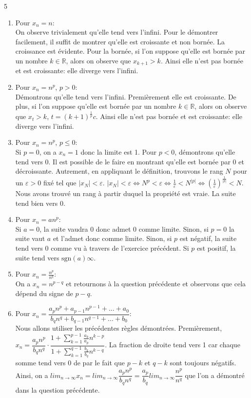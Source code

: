 5\documentclass[a4paper, 12pt, french, twoside]{article}
\newcommand{\Rr}{{\mathbb{R}}}
\begin{document}
\begin{enumerate}
    \item Pour $x_n=n$: \\
    On observe trivialement qu'elle tend vers l'infini. Pour le démontrer facilement, il suffit de montrer qu'elle est croissante et non bornée. La croissance est évidente. Pour la bornée, si l'on suppose qu'elle est bornée par un nombre $k\in \Rr$, alors on observe que $x_{k+1}>k$. Ainsi elle n'est pas bornée et est croissante: elle diverge vers l'infini.
    \item Pour $x_n=n^p$, $p>0$: \\
    Démontrons qu'elle tend vers l'infini. Premièrement elle est croissante. De plus, si l'on suppose qu'elle est bornée par un nombre $k\in \Rr$, alors on observe que $x_{t}>k$, $t=(k+1)^\tfrac{1}{p}c$. Ainsi elle n'est pas bornée et est croissante: elle diverge vers l'infini.
    \item Pour $x_n=n^p$, $p\leq0$: \\
    Si $p=0$, on a $x_n=1$ donc la limite est 1.
    Pour $p<0$, démontrons qu'elle tend vers 0. Il est possible de le faire en montrant qu'elle est bornée par 0 et décroissante. Autrement, en appliquant le définition, trouvons le rang $N$ pour un $\varepsilon>0$ fixé tel que $|x_N|<\varepsilon$.
    $|x_N|<\varepsilon \iff N^p<\varepsilon \iff \frac{1}{\varepsilon}<N^{|p|}\iff \left( \frac{1}{\varepsilon}\right)^{\tfrac{1}{|p|}} <N $. Nous avons trouvé un rang à partir duquel la propriété est vraie. La suite tend bien vers 0.
    \item Pour $x_n=a n^p$:\\
    Si $a=0$, la suite vaudra 0 donc admet 0 comme limite. Sinon, si $p=0$ la suite vaut $a$ et l'admet donc comme limite. Sinon, si $p$ est négatif, la suite tend vers 0 comme vu à travers de l'exercice précédent. Si $p$ est positif, la suite tend vers $\text{sgn}(a) \infty$.
    \item Pour $x_n=\frac{n^p}{n^q}$:\\
    On a $x_n=n^{p-q}$ et retournons à la question précédente et observons que cela dépend du signe de $p-q$.
    \item Pour $x_n=\dfrac{a_pn^p+a_{p-1}n^{p-1}+...+a_0}{b_qn^q+b_{q-1}n^{q-1}+...+b_0}$:\\
    Nous allons utiliser les précédentes règles démontrées. Premièrement, $x_n=\dfrac{a_pn^p}{b_qn^q}\cdot\dfrac{1+\sum_{k=1}^{p-1} \frac{a_k}{a_p}n^{k-p}}{1+\sum_{k=1}^{q-1} \frac{b_k}{b_q}n^{k-q}}$. La fraction de droite tend vers 1 car chaque somme tend vers 0 de par le fait que $p-k$ et $q-k$ sont toujours négatifs. Ainsi, on a $lim_{n\to\infty} x_n=lim_{n\to\infty} \dfrac{a_pn^p}{b_qn^q}=\dfrac{a_p}{b_q}lim_{n\to\infty} \dfrac{n^p}{n^q}$ que l'on a démontré dans la question précédente.  
\end{enumerate}
\end{document}
